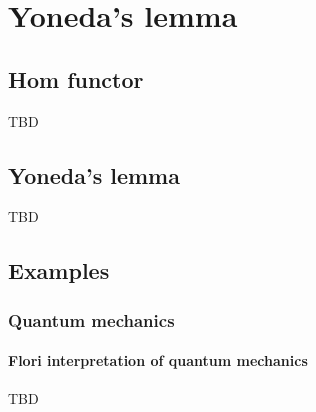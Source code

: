 \chapter{Yoneda's lemma}
\label{sec:yoneda}

\section{Hom functor}

TBD

\section{Yoneda's lemma}

TBD

\section{Examples}

\subsection{Quantum mechanics}

\subsubsection{Flori interpretation of quantum mechanics}
TBD
